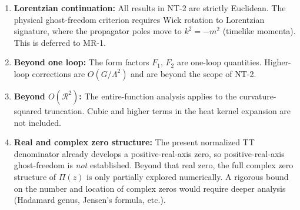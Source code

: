 \documentclass[12pt,a4paper]{article}
\theoremstyle{definition}
\theoremstyle{remark}
\begin{document}
\begin{enumerate}[label=\textbf{G\arabic*.}]
\item \textbf{Lorentzian continuation:}
  All results in NT-2 are strictly Euclidean.  The physical
  ghost-freedom criterion requires Wick rotation to Lorentzian
  signature, where the propagator poles move to $k^2 = -m^2$
  (timelike momenta).  This is deferred to MR-1.

\item \textbf{Beyond one loop:}
  The form factors $F_1$, $F_2$ are one-loop quantities.
  Higher-loop corrections are $O(G/\Lambda^2)$ and are beyond
  the scope of NT-2.

\item \textbf{Beyond $O(\mathcal{R}^2)$:}
  The entire-function analysis applies to the
  curvature-squared truncation.  Cubic and higher terms in the
  heat kernel expansion are not included.

\item \textbf{Real and complex zero structure:}
  The present normalized TT denominator already develops a
  positive-real-axis zero, so positive-real-axis ghost-freedom is
  \emph{not} established. Beyond that real zero, the full complex zero
  structure of $\Pi(z)$ is only partially explored numerically. A
  rigorous bound on the number and location of complex zeros would
  require deeper analysis (Hadamard genus, Jensen's formula, etc.).
\end{enumerate}
\end{document}
